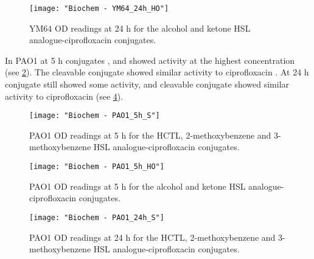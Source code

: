 \begin{figure}[H]
	\begin{center}
		\texttt{[image: "Biochem - YM64\_24h\_HO"]}
		\caption{YM64 OD readings at 24 h for the alcohol and ketone HSL analogue-ciprofloxacin conjugates.\label{fgr:YM64_24h_HO}}
	\end{center}
\end{figure}



In PAO1 at 5 h conjugates ,  and  showed activity at the highest concentration (see \ref{fgr:PAO1_5h_S}). 
The cleavable conjugate  showed similar activity to ciprofloxacin .
At 24 h conjugate  still showed some activity, and
cleavable conjugate  showed similar activity to ciprofloxacin  (see \ref{fgr:PAO1_24h_S}).




\begin{figure}[H]
	\begin{center}
		\texttt{[image: "Biochem - PAO1\_5h\_S"]}
		\caption{PAO1 OD readings at 5 h for the HCTL, 2-methoxybenzene and 3-methoxybenzene HSL analogue-ciprofloxacin conjugates.\label{fgr:PAO1_5h_S}}
	\end{center}
\end{figure}

\begin{figure}[H]
	\begin{center}
		\texttt{[image: "Biochem - PAO1\_5h\_HO"]}
		\caption{PAO1 OD readings at 5 h for the alcohol and ketone HSL analogue-ciprofloxacin conjugates.\label{fgr:PAO1_5h_HO}}
	\end{center}
\end{figure}


\begin{figure}[H]
	\begin{center}
		\texttt{[image: "Biochem - PAO1\_24h\_S"]}
		\caption{PAO1 OD readings at 24 h for the HCTL, 2-methoxybenzene and 3-methoxybenzene HSL analogue-ciprofloxacin conjugates.\label{fgr:PAO1_24h_S}}
	\end{center}
\end{figure}

